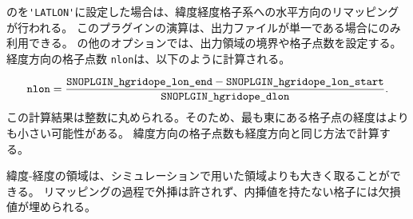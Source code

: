 のを\verb|'LATLON'|に設定した場合は、緯度経度格子系への水平方向のリマッピングが行われる。
このプラグインの演算は、出力ファイルが単一である場合にのみ利用できる。
の他のオプションでは、出力領域の境界や格子点数を設定する。
経度方向の格子点数 \verb|nlon|は、以下のように計算される。

\begin{eqnarray}
  \nmitemeq{nlon} = \frac{\nmitemeq{SNOPLGIN_hgridope_lon_end} - \nmitemeq{SNOPLGIN_hgridope_lon_start} }{\nmitemeq{SNOPLGIN_hgridope_dlon}} \nonumber.
\end{eqnarray}
\noindent
この計算結果は整数に丸められる。そのため、最も東にある格子点の経度はよりも小さい可能性がある。
緯度方向の格子点数も経度方向と同じ方法で計算する。

緯度-経度の領域は、シミュレーションで用いた領域よりも大きく取ることができる。
リマッピングの過程で外挿は許されず、内挿値を持たない格子には欠損値が埋められる。
